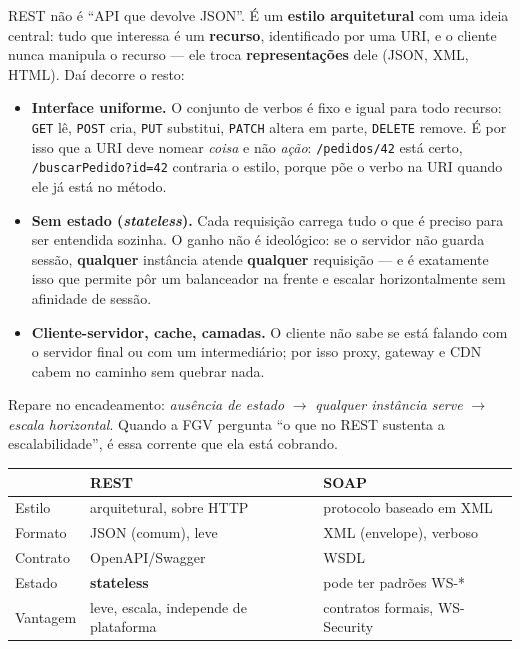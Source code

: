 \begin{conceito}
REST não é ``API que devolve JSON''. É um \textbf{estilo arquitetural} com uma
ideia central: tudo que interessa é um \textbf{recurso}, identificado por uma
URI, e o cliente nunca manipula o recurso --- ele troca
\textbf{representações} dele (JSON, XML, HTML). Daí decorre o resto:

\begin{itemize}
\item \textbf{Interface uniforme.} O conjunto de verbos é fixo e igual para
todo recurso: \texttt{GET} lê, \texttt{POST} cria, \texttt{PUT} substitui,
\texttt{PATCH} altera em parte, \texttt{DELETE} remove. É por isso que a URI
deve nomear \emph{coisa} e não \emph{ação}: \texttt{/pedidos/42} está certo,
\texttt{/buscarPedido?id=42} contraria o estilo, porque põe o verbo na URI
quando ele já está no método.
\item \textbf{Sem estado (\emph{stateless}).} Cada requisição carrega tudo o
que é preciso para ser entendida sozinha. O ganho não é ideológico: se o
servidor não guarda sessão, \textbf{qualquer} instância atende
\textbf{qualquer} requisição --- e é exatamente isso que permite pôr um
balanceador na frente e escalar horizontalmente sem afinidade de sessão.
\item \textbf{Cliente-servidor, cache, camadas.} O cliente não sabe se está
falando com o servidor final ou com um intermediário; por isso proxy, gateway
e CDN cabem no caminho sem quebrar nada.
\end{itemize}

Repare no encadeamento: \emph{ausência de estado} $\to$ \emph{qualquer
instância serve} $\to$ \emph{escala horizontal}. Quando a FGV pergunta ``o que
no REST sustenta a escalabilidade'', é essa corrente que ela está cobrando.
\end{conceito}

\begin{center}
\begin{tabular}{@{}p{2.6cm}p{4.6cm}p{4.6cm}@{}}
\toprule
& \textbf{REST} & \textbf{SOAP} \\
\midrule
Estilo & arquitetural, sobre HTTP & protocolo baseado em XML \\
Formato & JSON (comum), leve & XML (envelope), verboso \\
Contrato & OpenAPI/Swagger & WSDL \\
Estado & \textbf{stateless} & pode ter padrões WS-* \\
Vantagem & leve, escala, independe de plataforma & contratos formais, WS-Security \\
\bottomrule
\end{tabular}
\end{center}

